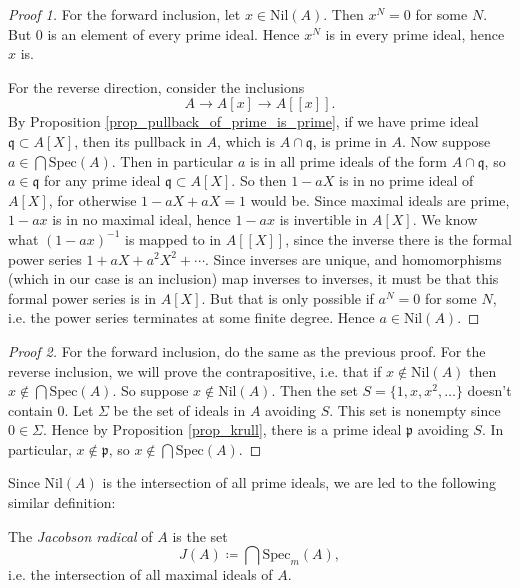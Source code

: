 \documentclass[12pt]{article}
\begin{document}
\begin{proof}[Proof 1] 
	For the forward inclusion, let $x\in\text{Nil}(A)$. Then $x^N=0$ for some $N$. But 0 is an element of every prime ideal. Hence $x^N$ is in every prime ideal, hence $x$ is.

	For the reverse direction, consider the inclusions 
	\begin{equation*}
		A \longrightarrow A[x] \longrightarrow A[[x]].
	\end{equation*}
	By Proposition \ref{prop_pullback_of_prime_is_prime}, if we have prime ideal $\mathfrak{q}\subset A[X]$, then its pullback in $A$, which is $A\cap\mathfrak{q}$, is prime in $A$. Now suppose $a\in\bigcap\text{Spec}(A)$. Then in particular $a$ is in all prime ideals of the form $A\cap\mathfrak{q}$, so $a\in\mathfrak{q}$ for any prime ideal $\mathfrak{q}\subset A[X]$. So then $1-aX$ is in no prime ideal of $A[X]$, for otherwise $1-aX+aX=1$ would be. Since maximal ideals are prime, $1-ax$ is in no maximal ideal, hence $1-ax$ is invertible in $A[X]$. We know what $(1-ax)^{-1}$ is mapped to in $A[[X]]$, since the inverse there is the formal power series $1+aX+a^2X^2+\cdots$. Since inverses are unique, and homomorphisms (which in our case is an inclusion) map inverses to inverses, it must be that this formal power series is in $A[X]$. But that is only possible if $a^N=0$ for some $N$, i.e. the power series terminates at some finite degree. Hence $a\in\text{Nil}(A)$. 
\end{proof}

\begin{proof}[Proof 2] 
	For the forward inclusion, do the same as the previous proof. For the reverse inclusion, we will prove the contrapositive, i.e. that if $x\not\in\text{Nil}(A)$ then $x\not\in\bigcap\text{Spec}(A)$. So suppose $x\not\in\text{Nil}(A)$. Then the set $S=\{1,x,x^2,\dots\}$ doesn't contain 0. Let $\Sigma$ be the set of ideals in $A$ avoiding $S$. This set is nonempty since $0\in\Sigma$. Hence by Proposition \ref{prop_krull}, there is a prime ideal $\mathfrak{p}$ avoiding $S$. In particular, $x\not\in\mathfrak{p}$, so $x\not\in\bigcap\text{Spec}(A)$. 
\end{proof}

Since $\text{Nil}(A)$ is the intersection of all prime ideals, we are led to the following similar definition:

\begin{definition}
	The \emph{Jacobson radical} of $A$ is the set 
	\begin{equation*}
		J(A) \coloneqq \bigcap \text{Spec}_m(A),
	\end{equation*}
	i.e. the intersection of all maximal ideals of $A$.
\end{definition}
\end{document}

